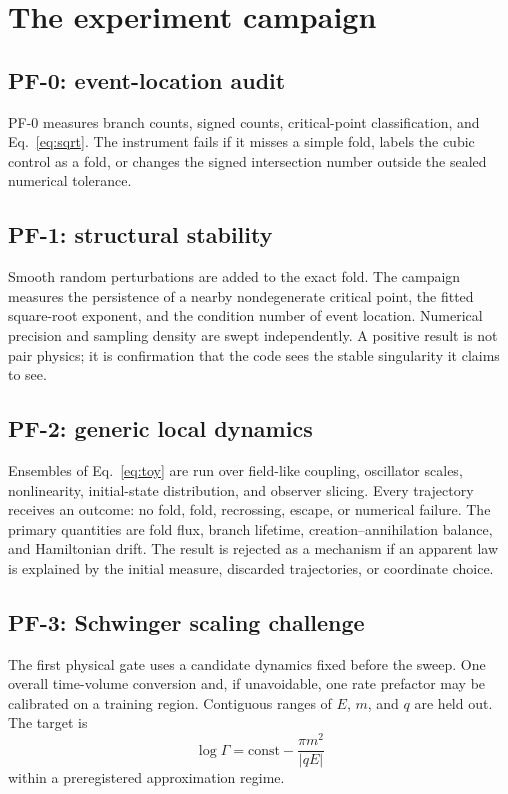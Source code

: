\documentclass[aps,prd,reprint,nofootinbib,longbibliography]{revtex4-2}
\begin{document}
\section{The experiment campaign}

\subsection{PF-0: event-location audit}

PF-0 measures branch counts, signed counts, critical-point classification, and
Eq.~\eqref{eq:sqrt}.  The instrument fails if it misses a simple fold, labels the
cubic control as a fold, or changes the signed intersection number outside the
sealed numerical tolerance.

\subsection{PF-1: structural stability}

Smooth random perturbations are added to the exact fold.  The campaign measures the
persistence of a nearby nondegenerate critical point, the fitted square-root
exponent, and the condition number of event location.  Numerical precision and
sampling density are swept independently.  A positive result is not pair physics;
it is confirmation that the code sees the stable singularity it claims to see.

\subsection{PF-2: generic local dynamics}

Ensembles of Eq.~\eqref{eq:toy} are run over field-like coupling, oscillator scales,
nonlinearity, initial-state distribution, and observer slicing.  Every trajectory
receives an outcome: no fold, fold, recrossing, escape, or numerical failure.  The
primary quantities are fold flux, branch lifetime, creation--annihilation balance,
and Hamiltonian drift.  The result is rejected as a mechanism if an apparent law is
explained by the initial measure, discarded trajectories, or coordinate choice.

\subsection{PF-3: Schwinger scaling challenge}

The first physical gate uses a candidate dynamics fixed before the sweep.  One
overall time-volume conversion and, if unavoidable, one rate prefactor may be
calibrated on a training region.  Contiguous ranges of $E$, $m$, and $q$ are held
out.  The target is
\begin{equation}
  \log\Gamma=\mathrm{const}-\frac{\pi m^2}{|qE|}
  \label{eq:schwinger}
\end{equation}
within a preregistered approximation regime.
\end{document}
